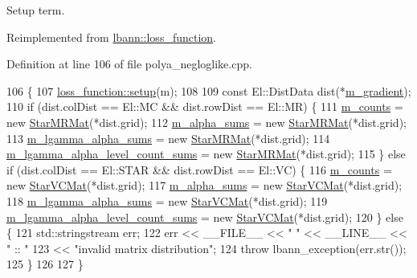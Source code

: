 Setup term. 

Reimplemented from \hyperlink{classlbann_1_1loss__function_a17a3629e8519c4215ad776a0c7b522ae}{lbann\+::loss\+\_\+function}.



Definition at line 106 of file polya\+\_\+negloglike.\+cpp.


\begin{DoxyCode}
106                                      \{
107   \hyperlink{classlbann_1_1loss__function_a17a3629e8519c4215ad776a0c7b522ae}{loss\_function::setup}(m);
108 
109   \textcolor{keyword}{const} El::DistData dist(*\hyperlink{classlbann_1_1loss__function_ac6ac9f8f2cef7a4daa1b282dba914975}{m\_gradient});
110   \textcolor{keywordflow}{if} (dist.colDist == El::MC && dist.rowDist == El::MR) \{
111     \hyperlink{classlbann_1_1polya__negloglike_a441387814cd7deafb1f70c91926d3004}{m\_counts} = \textcolor{keyword}{new} \hyperlink{base_8hpp_a638c3ca7c22f916d23415b234420b9f1}{StarMRMat}(*dist.grid);
112     \hyperlink{classlbann_1_1polya__negloglike_aa77620f256de700ae8b3ca921957bcd1}{m\_alpha\_sums} = \textcolor{keyword}{new} \hyperlink{base_8hpp_a638c3ca7c22f916d23415b234420b9f1}{StarMRMat}(*dist.grid);
113     \hyperlink{classlbann_1_1polya__negloglike_a0aec768ffa50a8b716149d597699eddb}{m\_lgamma\_alpha\_sums} = \textcolor{keyword}{new} \hyperlink{base_8hpp_a638c3ca7c22f916d23415b234420b9f1}{StarMRMat}(*dist.grid);
114     \hyperlink{classlbann_1_1polya__negloglike_a78c9da1fb83c7b79a12cfbf30a4cb59e}{m\_lgamma\_alpha\_level\_count\_sums} = \textcolor{keyword}{new} 
      \hyperlink{base_8hpp_a638c3ca7c22f916d23415b234420b9f1}{StarMRMat}(*dist.grid);
115   \} \textcolor{keywordflow}{else} \textcolor{keywordflow}{if} (dist.colDist == El::STAR && dist.rowDist == El::VC) \{
116     \hyperlink{classlbann_1_1polya__negloglike_a441387814cd7deafb1f70c91926d3004}{m\_counts} = \textcolor{keyword}{new} \hyperlink{base_8hpp_aa4ec814c4a8f15b4ea2b24b3af94ef23}{StarVCMat}(*dist.grid);
117     \hyperlink{classlbann_1_1polya__negloglike_aa77620f256de700ae8b3ca921957bcd1}{m\_alpha\_sums} = \textcolor{keyword}{new} \hyperlink{base_8hpp_aa4ec814c4a8f15b4ea2b24b3af94ef23}{StarVCMat}(*dist.grid);
118     \hyperlink{classlbann_1_1polya__negloglike_a0aec768ffa50a8b716149d597699eddb}{m\_lgamma\_alpha\_sums} = \textcolor{keyword}{new} \hyperlink{base_8hpp_aa4ec814c4a8f15b4ea2b24b3af94ef23}{StarVCMat}(*dist.grid);
119     \hyperlink{classlbann_1_1polya__negloglike_a78c9da1fb83c7b79a12cfbf30a4cb59e}{m\_lgamma\_alpha\_level\_count\_sums} = \textcolor{keyword}{new} 
      \hyperlink{base_8hpp_aa4ec814c4a8f15b4ea2b24b3af94ef23}{StarVCMat}(*dist.grid);
120   \} \textcolor{keywordflow}{else} \{
121     std::stringstream err;
122     err << \_\_FILE\_\_ << \textcolor{stringliteral}{" "} << \_\_LINE\_\_ << \textcolor{stringliteral}{" :: "}
123         << \textcolor{stringliteral}{"invalid matrix distribution"};
124     \textcolor{keywordflow}{throw} lbann\_exception(err.str());
125   \}
126 
127 \}
\end{DoxyCode}
